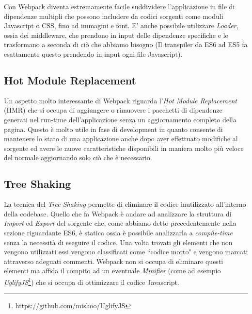Con Webpack diventa estremamente facile suddividere l'applicazione in file di dipendenze multipli che possono includere da codici sorgenti come moduli Javascript o CSS, fino ad immagini e font.
E' anche possibile utilizzare \textit{Loader}, ossia dei middleware, che prendono in input delle dipendenze specifiche e le trasformano a seconda di ciò che abbiamo bisogno (Il transpiler da ES6 ad ES5 fa esattamente questo prendendo in input ogni file Javascript).

\subsection{Hot Module Replacement}
Un aspetto molto interessante di Webpack riguarda l'\textit{Hot Module Replacement} (HMR) che si occupa di aggiungere o rimuovere i pacchetti di dipendenze generati nel run-time dell'applicazione senza un aggiornamento completo della pagina. Questo è molto utile in fase di development in quanto consente di mantenere lo stato di una applicazione anche dopo aver effettuato modifiche al sorgente ed avere le nuove caratteristiche disponibili in maniera molto più veloce del normale aggiornando solo ciò che è necessario. 



\subsection{Tree Shaking}
La tecnica del \textit{Tree Shaking} permette di eliminare il codice inutilizzato all'interno della codebase. Quello che fa Webpack è andare ad analizzare la struttura di \textit{Import} ed \textit{Export} del sorgente che, come abbiamo detto precedentemente nella sezione riguardante ES6, è statica ossia è possibile analizzarla a \textit{compile-time} senza la necessità di eseguire il codice. Una volta trovati gli elementi che non vengono utilizzati essi vengono classificati come “codice morto" e vengono marcati attraverso adeguati commenti. Webpack non si occupa di eliminare questi elementi ma affida il compito ad un eventuale \textit{Minifier} (come ad esempio \textit{UglifyJS}\footnote{https://github.com/mishoo/UglifyJS}) che si occupa di ottimizzare il codice Javascript.

